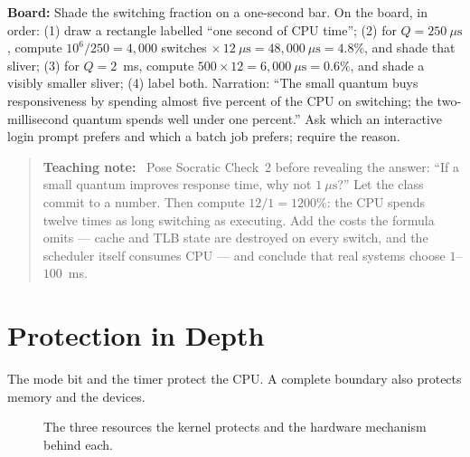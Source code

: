 \documentclass[11pt]{article}
\newenvironment{teachingaside}{\begin{quote}\small\color{primary-gold}\textbf{Teaching note:}\ }{\end{quote}}
\begin{document}
\noindent\textbf{Board:} Shade the switching fraction on a one-second bar. On the board, in order: (1) draw a rectangle labelled ``one second of CPU time''; (2) for $Q=250\ \mu\text{s}$, compute $10^6/250 = 4{,}000$ switches $\times\,12\ \mu\text{s} = 48{,}000\ \mu\text{s}=4.8\%$, and shade that sliver; (3) for $Q=2$~ms, compute $500\times12=6{,}000\ \mu\text{s}=0.6\%$, and shade a visibly smaller sliver; (4) label both. Narration: ``The small quantum buys responsiveness by spending almost five percent of the CPU on switching; the two-millisecond quantum spends well under one percent.'' Ask which an interactive login prompt prefers and which a batch job prefers; require the reason.

\begin{teachingaside}
Pose Socratic Check~2 before revealing the answer: ``If a small quantum improves response time, why not $1\ \mu\text{s}$?'' Let the class commit to a number. Then compute $12/1=1200\%$: the CPU spends twelve times as long switching as executing. Add the costs the formula omits --- cache and TLB state are destroyed on every switch, and the scheduler itself consumes CPU --- and conclude that real systems choose $1$--$100$~ms.
\end{teachingaside}

\section{Protection in Depth}

The mode bit and the timer protect the CPU. A complete boundary also protects memory and the devices.

\begin{figure}[h]
  \centering
  \caption{The three resources the kernel protects and the hardware mechanism behind each.}
  \label{fig:three-things}
\end{figure}
\end{document}
